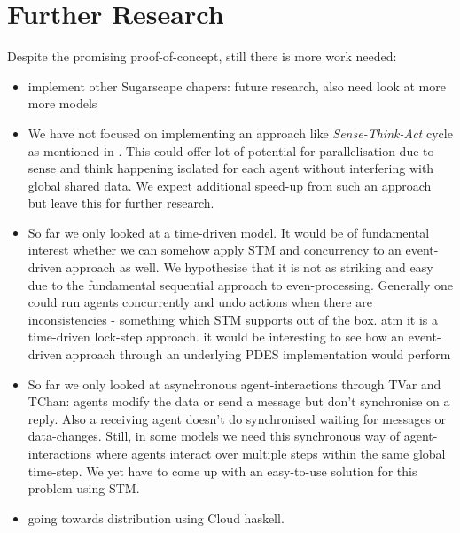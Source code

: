 \section{Further Research}
Despite the promising proof-of-concept, still there is more work needed:

\begin{itemize}
	\item implement other Sugarscape chapers: future research, also need look at more more models
	\item We have not focused on implementing an approach like \textit{Sense-Think-Act} cycle as mentioned in \cite{xiao_survey_2018}. This could offer lot of potential for parallelisation due to sense and think happening isolated for each agent without interfering with global shared data. We expect additional speed-up from such an approach but leave this for further research.
	\item So far we only looked at a time-driven model. It would be of fundamental interest whether we can somehow apply STM and concurrency to an event-driven approach as well. We hypothesise that it is not as striking and easy due to the fundamental sequential approach to even-processing. Generally one could run agents concurrently and undo actions when there are inconsistencies - something which STM supports out of the box. atm it is a time-driven lock-step approach. it would be interesting to see how an event-driven approach through an underlying PDES implementation would perform
	\item So far we only looked at asynchronous agent-interactions through TVar and TChan: agents modify the data or send a message but don't synchronise on a reply. Also a receiving agent doesn't do synchronised waiting for messages or data-changes. Still, in some models we need this synchronous way of agent-interactions where agents interact over multiple steps within the same global time-step. We yet have to come up with an easy-to-use solution for this problem using STM.
	\item going towards distribution using Cloud haskell.
\end{itemize}

